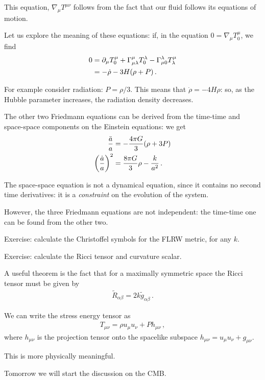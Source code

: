 \documentclass[main.tex]{subfiles}
\begin{document}
This equation, \(\nabla_{\mu } T^{\mu \nu }\) follows from the fact that our fluid follows its equations of motion. 

Let us explore the meaning of these equations: if, in the equation \(0 = \nabla_{\mu } T^{\mu}_{0}\),  we find 
%
\begin{align}
0 &= \partial_{\mu } T^{\mu }_{0} + \Gamma^{\mu }_{\mu \lambda } T^{\lambda }_{0} - \Gamma^{\lambda }_{\mu 0} T^{\mu }_{\lambda }  \\
&= - \dot{\rho}- 3 H \qty(\rho + P) 
\,.
\end{align}

For example consider radiation: \(P = \rho /3\). This means that \(\dot{\rho}= - 4 H \rho  \): so, as the Hubble parameter increases, the radiation density decreases.

The other two Friedmann equations can be derived from the time-time and space-space components on the Einstein equations: we get 
%
\begin{align}
\frac{\ddot{a}}{a} &= - \frac{4 \pi G}{ 3} \qty(\rho + 3 P)  \\
\qty(\frac{\dot{a}}{a})^2 &= \frac{8 \pi G}{3} \rho - \frac{k}{a^2}
\,.
\end{align}

The space-space equation is not a dynamical equation, since it contains no second time derivatives: it is a \emph{constraint} on the evolution of the system. 

However, the three Friedmann equations are not independent: the time-time one can be found from the other two. 

\begin{greenbox}
Exercise: calculate the Christoffel symbols for the FLRW metric, for any \(k\). 
\end{greenbox}

\begin{greenbox}
Exercise: calculate the Ricci tensor and curvature scalar. 
\end{greenbox}

A useful theorem is the fact that for a maximally symmetric space the Ricci tensor must be given by
%
\begin{align}
\widetilde{R}_{\alpha \beta } = 2 k \widetilde{g}_{\alpha \beta }
\,. 
\end{align}

We can write the stress energy tensor as 
%
\begin{align}
T_{\mu \nu } = \rho u_{\mu } u_{\nu } + P h_{\mu \nu }
\,,
\end{align}
%
where \(h_{\mu \nu } \) is the projection tensor onto the spacelike subspace \(h_{\mu \nu } = u_{\mu} u_{\nu } + g_{\mu \nu }\). 

This is more physically meaningful. 

Tomorrow we will start the discussion on the CMB. 
\end{document}
